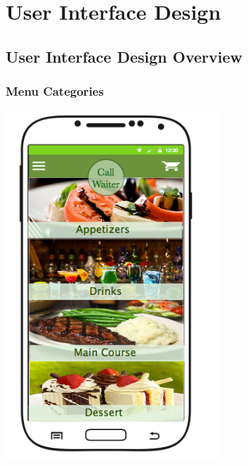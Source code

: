 \documentclass[12pt, titlepage]{article}
\begin{document}
\section{User Interface Design}

\subsection{User Interface Design Overview}

\subsubsection{Menu Categories}
\includegraphics[width=80mm,scale=0.5]{MenuCategories.png}
\end{document}
